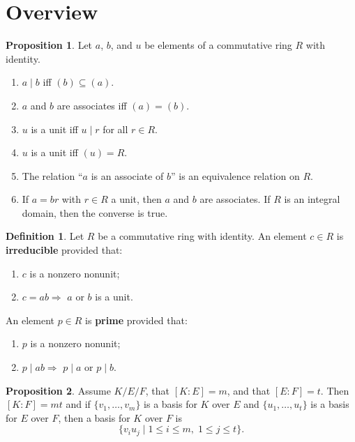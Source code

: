 \documentclass{article}
\makeatletter
\theoremstyle{definition}
\newtheorem{prop}{Proposition}[section]
\newtheorem{definition}{Definition}[section]
\theoremstyle{remark}
\let\oldproofname=\proofname
\renewcommand{\proofname}{\textit{\oldproofname}}
\theoremstyle{definition}
\renewenvironment{proof}[1][\proofname]{\par
  \pushQED{\qed}%
  \normalfont \topsep6\p@\@plus6\p@\relax
  \list{}{\leftmargin=0mm
          \rightmargin=0mm
          \settowidth{\itemindent}{\itshape#1}%
          \labelwidth=\itemindent
          \parsep=0pt \listparindent=0mm%
  }
  \item[\hskip\labelsep
        \itshape
    #1\@addpunct{.}]\ignorespaces
}{%
  \popQED\endlist\@endpefalse
}
\makeatother
\begin{document}
\section{Overview}
    \begin{prop}
        Let $a$, $b$, and $u$ be elements of a commutative ring $R$ with identity.     \begin{enumerate}[label=(\roman*)]
                \item $a\mid b$ iff $(b)\subseteq(a)$.
                \item $a$ and $b$ are associates iff $(a)=(b)$.
                \item $u$ is a unit iff $u\mid r$ for all $r\in R$.
                \item $u$ is a unit iff $(u)=R$.
                \item The relation ``$a$ is an associate of $b$'' is an equivalence relation on $R$.
                \item If $a=br$ with $r\in R$ a unit, then $a$ and $b$ are associates. If $R$ is an integral domain, then the converse is true.
            \end{enumerate}
    \end{prop}
        \begin{proof}
        
        \end{proof}
    \begin{definition}
        Let $R$ be a commutative ring with identity. An element $c\in R$ is \textbf{irreducible} provided that:
            \begin{enumerate}[label=(\roman*)]
                \item $c$ is a nonzero nonunit;
                \item $c=ab\Rightarrow$ $a$ or $b$ is a unit.
            \end{enumerate}
        An element $p\in R$ is \textbf{prime} provided that:
            \begin{enumerate}[label=(\roman*)]
                \item $p$ is a nonzero nonunit;
                \item $p\mid ab\Rightarrow$ $p\mid a$ or $p\mid b$.
            \end{enumerate}
    \end{definition}
    \begin{prop}
        Assume $K/E/F$, that $[K\colon E]=m$, and that $[E\colon F]=t$. Then $[K\colon F]=mt$ and if $\{v_1,\dots,v_m\}$ is a basis for $K$ over $E$ and $\{u_1,\dots,u_t\}$ is a basis for $E$ over $F$, then a basis for $K$ over $F$ is
            \begin{equation*}
                \{v_iu_j\mid 1\leq i\leq m,\; 1\leq j\leq t\}.
            \end{equation*}
    \end{prop}
\end{document}
